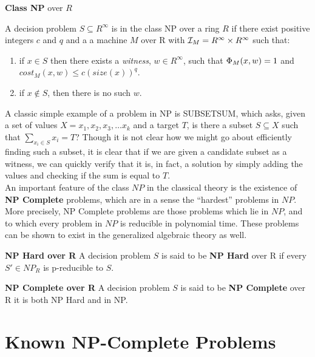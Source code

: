 \begin{definition}{\textbf{Class NP} over $R$}

  A decision problem $S \subseteq R^\infty$ is in the class NP over a
  ring $R$ if there exist positive integers $c$ and $q$ and a a
  machine $M$ over R with $\mathcal{I}_M = R^\infty \times R^\infty$ such
  that:

  \begin{enumerate}
  \item if $x \in S$ then there exists a \emph{witness}, $w
    \in R^\infty$, such that $\Phi_M(x,w) = 1$ and
    $cost_M(x,w) \leq c(size(x))^q$.
  \item if $x \notin S$, then there is no such $w$.
  \end{enumerate}
\end{definition}

A classic simple example of a problem in NP is SUBSETSUM, which asks,
given a set of values $X = {x_1, x_2, x_3, \ldots x_k}$ and a target
$T$, is there a subset $S \subseteq X$ such that $\sum\limits_{x_i \in
  S} x_i = T$?  Though it is not clear how we might go about
efficiently finding such a subset, it is clear that if we are given a
candidate subset as a witness, we can quickly verify that it is, in
fact, a solution by simply adding the values and checking if the sum
is equal to $T$.\\

An important feature of the class $NP$ in the classical theory is the
existence of \textbf{NP Complete} problems, which are in a sense the
``hardest'' problems in $NP$.  More precisely, NP Complete problems
are those problems which lie in $NP$, and to which every problem in
$NP$ is reducible in polynomial time.  These problems can be shown to
exist in the generalized algebraic theory as well.

\begin{definition}{\textbf{NP Hard over R}}
  A decision problem $S$ is said to be \textbf{NP Hard} over R if
  every $S' \in NP_R$ is p-reducible to $S$.
\end{definition}

\begin{definition}{\textbf{NP Complete over R}}
  A decision problem $S$ is said to be \textbf{NP Complete} over R it
  is both NP Hard and in NP.
\end{definition}

\section{Known NP-Complete Problems}

